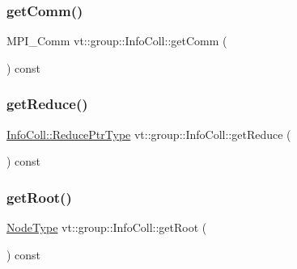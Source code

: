\mbox{\label{structvt_1_1group_1_1_info_coll_a9f9dfa148d52cdc913fbaf1398f1fb48}} 
\subsubsection{\texorpdfstring{get\+Comm()}{getComm()}}
{\footnotesize\ttfamily M\+P\+I\+\_\+\+Comm vt\+::group\+::\+Info\+Coll\+::get\+Comm (\begin{DoxyParamCaption}{ }\end{DoxyParamCaption}) const}

\mbox{\label{structvt_1_1group_1_1_info_coll_a297cafe0cae350b83a677db585865e62}} 
\subsubsection{\texorpdfstring{get\+Reduce()}{getReduce()}}
{\footnotesize\ttfamily \hyperlink{structvt_1_1group_1_1_info_coll_a1b9fe0214f622ed9e8987531f44ef1fa}{Info\+Coll\+::\+Reduce\+Ptr\+Type} vt\+::group\+::\+Info\+Coll\+::get\+Reduce (\begin{DoxyParamCaption}{ }\end{DoxyParamCaption}) const}

\mbox{\label{structvt_1_1group_1_1_info_coll_a5724786f46add3ccf7ca081774609f0c}} 
\subsubsection{\texorpdfstring{get\+Root()}{getRoot()}}
{\footnotesize\ttfamily \hyperlink{namespacevt_a866da9d0efc19c0a1ce79e9e492f47e2}{Node\+Type} vt\+::group\+::\+Info\+Coll\+::get\+Root (\begin{DoxyParamCaption}{ }\end{DoxyParamCaption}) const}

